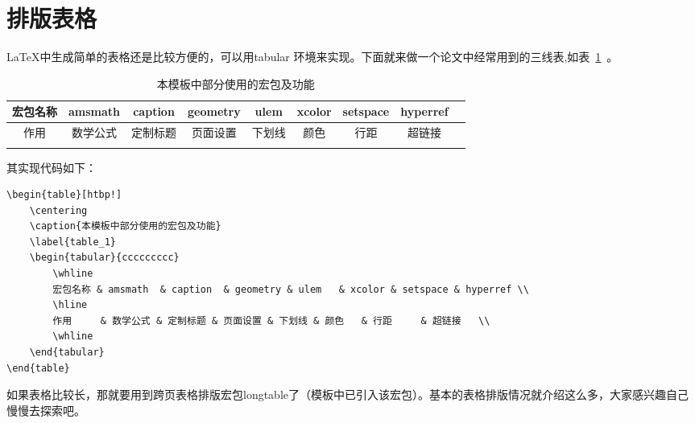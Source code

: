 \section{排版表格}

\LaTeX 中生成简单的表格还是比较方便的，可以用tabular 环境来实现。下面就来做一个论文中经常用到的三线表,如表~\ref{table_1}~。

\begin{table}[htbp!]
    \centering
    \caption{本模板中部分使用的宏包及功能}
    \label{table_1}
    \begin{tabular}{ccccccccc}
        \whline
        宏包名称 & amsmath  & caption  & geometry & ulem   & xcolor & setspace & hyperref \\
        \hline
        作用     & 数学公式 & 定制标题 & 页面设置 & 下划线 & 颜色   & 行距     & 超链接   \\
        \whline
    \end{tabular}
\end{table}

其实现代码如下：

{
\color{green!50!black}
\begin{lstlisting}[breaklines=true,]
\begin{table}[htbp!]
    \centering
    \caption{本模板中部分使用的宏包及功能}
    \label{table_1}
    \begin{tabular}{ccccccccc}
        \whline
        宏包名称 & amsmath  & caption  & geometry & ulem   & xcolor & setspace & hyperref \\
        \hline
        作用     & 数学公式 & 定制标题 & 页面设置 & 下划线 & 颜色   & 行距     & 超链接   \\
        \whline
    \end{tabular}
\end{table}
\end{lstlisting}
}

如果表格比较长，那就要用到跨页表格排版宏包longtable了（模板中已引入该宏包）。基本的表格排版情况就介绍这么多，大家感兴趣自己慢慢去探索吧。
